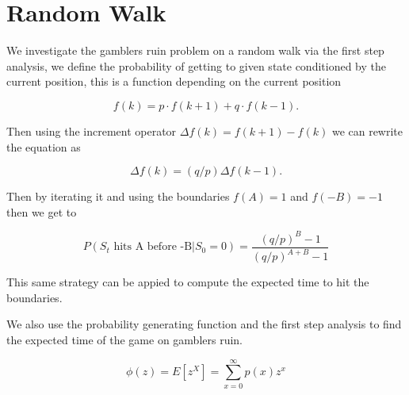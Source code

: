\section{Random Walk}

We investigate the gamblers ruin problem on a random walk via the first step analysis,
we define the probability of getting to given state conditioned by the current position,
this is a function depending on the current position

\begin{equation*}
    f(k) = p \cdot f(k + 1) + q \cdot f(k - 1).
\end{equation*}

Then using the increment operator $\Delta f(k) = f(k + 1) - f(k)$ we can rewrite the equation as

\begin{equation*}
    \Delta f(k) = (q / p) \Delta f(k - 1).
\end{equation*}

Then by iterating it and using the boundaries $f(A) = 1$ and $f(-B) = -1$ then we get to

\begin{equation*}
    P(S_t \text{ hits A before -B} | S_0 = 0) = \frac{(q / p)^B - 1}{(q / p)^{A + B} - 1}
\end{equation*}

This same strategy can be appied to compute the expected time to hit the boundaries.

We also use the probability generating function and the first step analysis to find the expected time of the game on gamblers ruin.

\begin{equation*}
    \phi(z) = E[z^X] = \sum_{x=0}^{\infty} p(x) z^x
\end{equation*}
